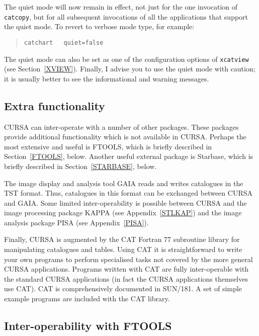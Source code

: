 \documentclass[twoside,11pt]{article}
\newcommand{\xref}[3]{#1}
\renewcommand{\_}{\texttt{\symbol{95}}}
\begin{document}
The quiet mode will now remain in effect, not just for the one invocation
of {\tt catcopy}, but for all subsequent invocations of all the applications
that support the quiet mode.  To revert to verbose mode type, for example:

\begin{verse}
{\tt catchart ~ quiet=false}
\end{verse}

The quiet mode can also be set as one of the configuration options
of {\tt xcatview} (see Section~\ref{XVIEW}).  Finally, I advise you to
use the quiet mode with caution; it is usually better to see the
informational and warning messages.

\subsection{Extra functionality}

CURSA can inter-operate with a number of other packages.  These
packages provide additional functionality which is not available in
CURSA.  Perhaps the most extensive and useful is FTOOLS, which is
briefly described in Section~\ref{FTOOLS}, below.  Another useful
external package is Starbase, which is briefly described in
Section~\ref{STARBASE}, below.

The image display and analysis tool \xref{GAIA}{sun214}{}\cite{SUN214}
reads and writes catalogues in the TST format.  Thus, catalogues in
this format can be exchanged between CURSA and GAIA.  Some limited
inter-operability is possible between CURSA and the image processing
package \xref{KAPPA}{sun95}{}\cite{SUN95} (see Appendix~\ref{STLKAP}) and
the image analysis package \xref{PISA}{sun109}{}\cite{SUN109} (see
Appendix~\ref{PISA}).

Finally, CURSA is augmented by the CAT Fortran 77 subroutine library for
manipulating catalogues and tables.  Using CAT it is straightforward to
write your own programs to perform specialised tasks not covered by the
more general CURSA applications. Programs written with CAT are fully
inter-operable with the standard CURSA applications (in fact the CURSA
applications themselves use CAT). CAT is comprehensively documented in
\xref{SUN/181}{sun181}{}\cite{SUN181}.  A set of simple example programs
are included with the CAT library.

\subsection{\label{FTOOLS}Inter-operability with FTOOLS}
\end{document}
